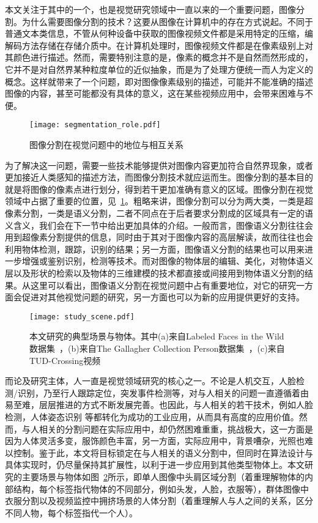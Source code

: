 本文关注于其中的一个，也是视觉研究领域中一直以来的一个重要问题，图像分割。为什么需要图像分割的技术？这要从图像在计算机中的存在方式说起。不同于普通文本类信息，不管从何种设备中获取的图像视频文件都是采用特定的压缩，编解码方法存储在存储介质中。在计算机处理时，图像视频文件都是在像素级别上对其颜色进行描述。然而，需要特别注意的是，像素的概念并不是自然而然形成的，它并不是对自然界某种粒度单位的近似抽象，而是为了处理方便统一而人为定义的概念。这样就带来了一个问题，即对图像像素级别的描述，可能并不能准确的描述图像的内容，甚至可能都没有具体的意义，这在某些视频应用中，会带来困难与不便。

\begin{figure}[H] %
  \centering
  \texttt{[image: segmentation\_role.pdf]}
  \caption{图像分割在视觉问题中的地位与相互关系}
  \label{fig:seg_role}
\end{figure}

为了解决这一问题，需要一些技术能够提供对图像内容更加符合自然界现象，或者更加接近人类感知的描述方法，而图像分割技术就应运而生。图像分割的基本目的就是将图像的像素点进行划分，得到若干更加准确有意义的区域。图像分割在视觉领域中占据了重要的位置，见~\ref{fig:seg_role}。粗略来讲，图像分割可以分为两大类，一类是超像素分割，一类是语义分割，二者不同点在于后者要求分割成的区域具有一定的语义含义，我们会在下一节中给出更加具体的介绍。一般而言，图像语义分割往往会用到超像素分割提供的信息，同时由于其对于图像内容的高层解读，故而往往也会利用物体检测，跟踪，识别的结果；另一方面，图像语义分割的结果也可以用来进一步增强或鉴别识别，检测等技术。而对图像的物体层的编辑、美化，对物体语义层以及形状的检索以及物体的三维建模的技术都直接或间接用到物体语义分割的结果。从这里可以看出，图像语义分割在视觉问题中占有重要地位，对它的研究一方面会促进对其他视觉问题的研究，另一方面也可以为新的应用提供更好的支持。

\begin{figure}[H]
  \centering
  \texttt{[image: study\_scene.pdf]}
  \caption{本文研究的典型场景与物体。其中(a)来自Labeled Faces in the Wild数据集~\cite{lfw}，(b)来自The Gallagher Collection Person数据集~\cite{cloth_coseg}，(c)来自TUD-Crossing视频~\cite{tud_crossing}}
  \label{fig:study_scene}
\end{figure}

而论及研究主体，人一直是视觉领域研究的核心之一。不论是人机交互，人脸检测/识别，乃至行人跟踪定位，突发事件检测等，对与人相关的问题一直遵循着由易至难，层层推进的方式不断发展完善。也因此，与人相关的若干技术，例如人脸检测\cite{hc_facedtection}，人体姿态识别\cite{kinect} 等都转化为成功的工业应用，从而具有高度的应用价值。然而，与人相关的分割问题在实际应用中，却仍然困难重重，挑战极大，这一方面是因为人体灵活多变，服饰颜色丰富，另一方面，实际应用中，背景嘈杂，光照也难以控制。鉴于此，本文将目标锁定在与人相关的语义分割中，但同时在算法设计与具体实现时，仍尽量保持其扩展性，以利于进一步应用到其他类型物体上。本文研究的主要场景与物体如图~\ref{fig:study_scene}所示，即单人图像中头肩区域分割（着重理解物体的内部结构，每个标签指代物体的不同部分，例如头发，人脸，衣服等），群体图像中衣服分割以及视频监控中拥挤场景的人体分割（着重理解人与人之间的关系，区分不同人物，每个标签指代一个人）。

